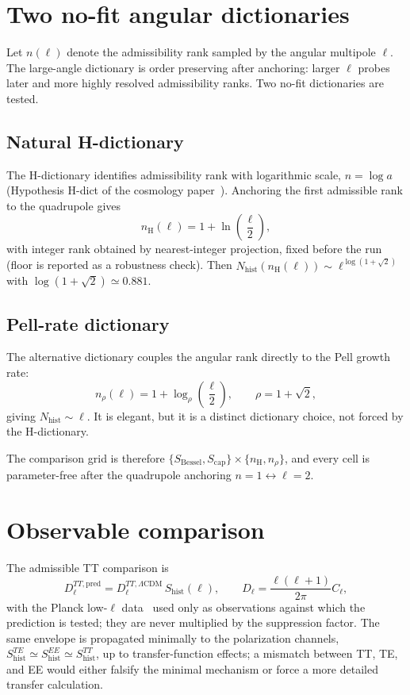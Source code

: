 \documentclass[11pt]{article}
\newcommand{\Nhist}{N_{\mathrm{hist}}}
\newcommand{\Shist}{S_{\mathrm{hist}}}
\newcommand{\lcdm}{\Lambda\mathrm{CDM}}
\begin{document}
\section{Two no-fit angular dictionaries}
\label{sec:dictionaries}

Let $n(\ell)$ denote the admissibility rank sampled by the angular multipole $\ell$.
The large-angle dictionary is order preserving after anchoring: larger $\ell$ probes later and more
highly resolved admissibility ranks.
Two no-fit dictionaries are tested.

\subsection{Natural H-dictionary}

The H-dictionary identifies admissibility rank with logarithmic scale, $n=\log a$
(Hypothesis H-dict of the cosmology paper~\cite{Beau2026d}).
Anchoring the first admissible rank to the quadrupole gives
\[
n_{\mathrm{H}}(\ell)=1+\ln\!\left(\frac{\ell}{2}\right),
\]
with integer rank obtained by nearest-integer projection, fixed before the run (floor is reported
as a robustness check).
Then $\Nhist(n_{\mathrm{H}}(\ell))\sim\ell^{\log(1+\sqrt2)}$ with $\log(1+\sqrt2)\simeq0.881$.

\subsection{Pell-rate dictionary}

The alternative dictionary couples the angular rank directly to the Pell growth rate:
\[
n_{\rho}(\ell)=1+\log_{\rho}\!\left(\frac{\ell}{2}\right),
\qquad
\rho=1+\sqrt{2},
\]
giving $\Nhist\sim\ell$.
It is elegant, but it is a distinct dictionary choice, not forced by the H-dictionary.

The comparison grid is therefore
$\{S_{\mathrm{Bessel}},S_{\mathrm{cap}}\}\times\{n_{\mathrm{H}},n_{\rho}\}$, and every cell is
parameter-free after the quadrupole anchoring $n=1\leftrightarrow\ell=2$.

\section{Observable comparison}
\label{sec:comparison}

The admissible TT comparison is
\[
D_\ell^{TT,\mathrm{pred}}=D_\ell^{TT,\lcdm}\,\Shist(\ell),
\qquad
D_\ell=\frac{\ell(\ell+1)}{2\pi}C_\ell ,
\]
with the Planck low-$\ell$ data~\cite{Planck2018} used only as observations against which the
prediction is tested; they are never multiplied by the suppression factor.
The same envelope is propagated minimally to the polarization channels,
$S^{TE}_{\mathrm{hist}}\simeq S^{EE}_{\mathrm{hist}}\simeq S^{TT}_{\mathrm{hist}}$, up to
transfer-function effects; a mismatch between TT, TE, and EE would either falsify the minimal
mechanism or force a more detailed transfer calculation.
\end{document}
